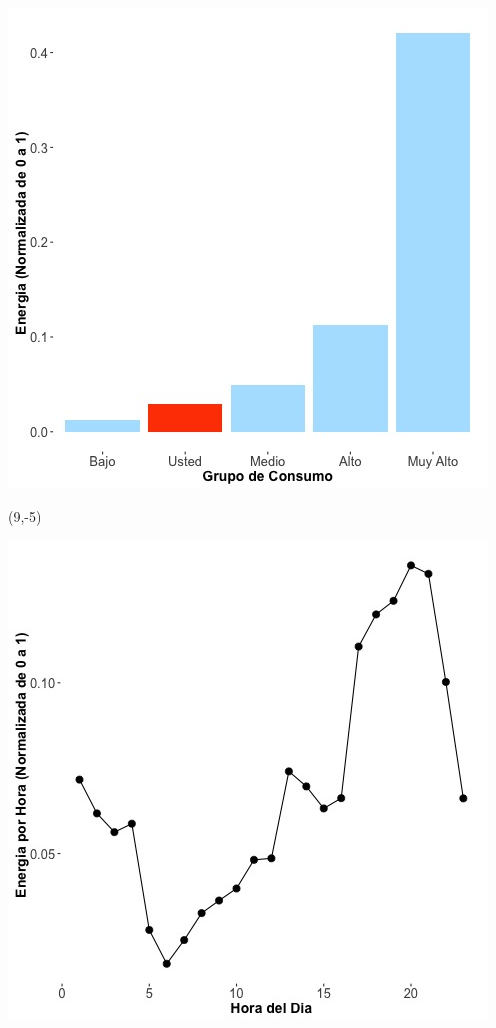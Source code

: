 \documentclass{article}\usepackage[]{graphicx}\usepackage[]{color}
\newenvironment{knitrout}{}{} %
\begin{document}
\begin{knitrout}
\color{fgcolor}
\includegraphics[scale=0.65]{figure/A9_neighbor_plot} 
\end{knitrout}

 \begin{textblock}{1}(9,-5)
\begin{minipage}{20em}
\begingroup

\endgroup
\end{minipage}
\end{textblock}


\begin{knitrout}
\color{fgcolor}
\includegraphics[scale=0.65]{figure/A9_plot_norm_median} 
\end{knitrout}
\end{document}
